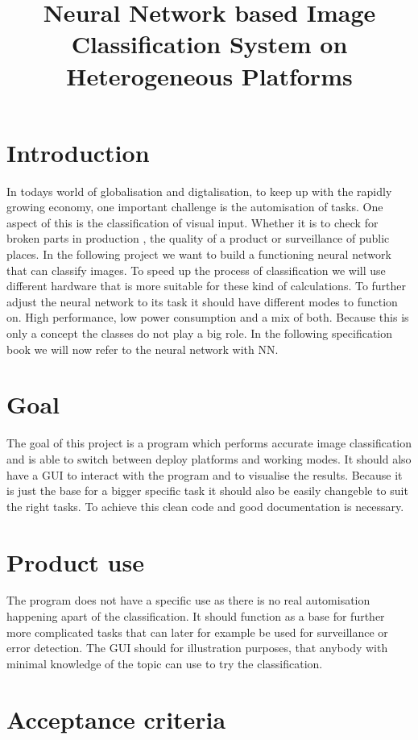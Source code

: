 \documentclass[parskip=full]{scrartcl}
\title{Neural Network based Image Classification System on Heterogeneous Platforms}
\author{}
\begin{document}
\maketitle

\section{Introduction}
In todays world of globalisation and digtalisation, to keep up with the rapidly growing economy, one important challenge is the automisation of tasks. One aspect of this is the classification of visual input. Whether it is to check for broken parts in production , the quality of a product or surveillance of public places. In the following project we want to build a functioning neural network that can classify images. To speed up the process of classification we will use different hardware that is more suitable for these kind of calculations. To further adjust the neural network to its task it should have different modes to function on. High performance, low power consumption and a mix of both. Because this is only a concept the classes do not play a big role. In the following specification book we will now refer to the neural network with NN.


\section{Goal}
The goal of this project is a program which performs accurate image classification and is able to switch between deploy platforms and working modes.
It should also have a GUI to interact with the program and to visualise the results.
Because it is just the base for a bigger specific task it should also be easily changeble to suit the right tasks. To achieve this clean code and good documentation is necessary.


\section{Product use}
The program does not have a specific use as there is no real automisation happening apart of the classification. It should function as a base for further more complicated tasks that can later for example be used for surveillance or error detection. The GUI should for illustration purposes, that anybody with minimal knowledge of the topic can use to try the classification.


\section{Acceptance criteria}
\end{document}

